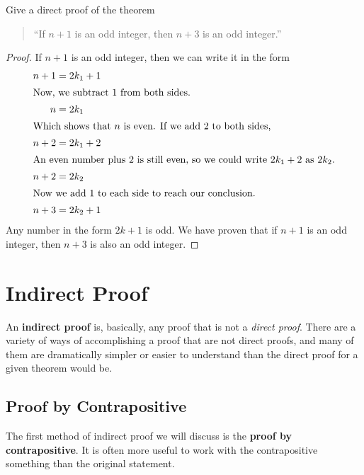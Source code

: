 \begin{ex}
  Give a direct proof of the theorem
  \begin{quote} ``If $n+1$ is an odd integer, then $n+3$ is an odd integer.''
  \end{quote}
  \begin{proof}
    If $n+1$ is an odd integer, then we can write it in the form
    \begin{align*}
      n+1 &= 2k_1+1 \\
      \intertext{Now, we subtract $1$ from both sides.}
      n &= 2k_1 \\ \intertext{Which shows that $n$ is even. If we add $2$ to both sides,}
      n+2 &= 2k_1 +2 \\
      \intertext{An even number plus $2$ is still even, so we could write $2k_1+2$ as $2k_2$.}
      n+2 &= 2k_2 \\
      \intertext{Now we add $1$ to each side to reach our conclusion.}
      n+3 &= 2k_2 + 1
    \end{align*}
    Any number in the form $2k+1$ is odd.
    We have proven that if $n+1$ is an odd integer, then $n+3$ is also an odd integer.
  \end{proof}
\end{ex}

\section{Indirect Proof}

An \textbf{indirect proof} is, basically, any proof that is not a \emph{direct proof}.
There are a variety of ways of accomplishing a proof that are not direct proofs,
and many of them are dramatically simpler or easier to understand than the direct
proof for a given theorem would be.

\subsection{Proof by Contrapositive}\label{sec:contrapositive}
The first method of indirect proof we will discuss is the \textbf{proof by contrapositive}.
It is often more useful to work with the contrapositive something than the original statement.

